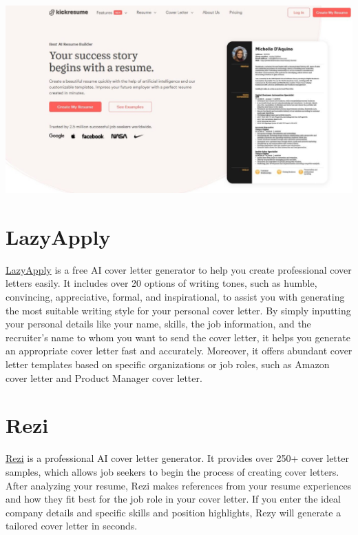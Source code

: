 \documentclass[
]{book}
\begin{document}
\includegraphics[width=5.46875in,height=\textheight]{Kickresume pic.png}

\hypertarget{lazyapply}{%
\section{LazyApply}\label{lazyapply}}

\href{https://lazyapply.com/cover-letter-generator}{LazyApply} is a free AI cover letter generator to help you create professional cover letters easily. It includes over 20 options of writing tones, such as humble, convincing, appreciative, formal, and inspirational, to assist you with generating the most suitable writing style for your personal cover letter. By simply inputting your personal details like your name, skills, the job information, and the recruiter's name to whom you want to send the cover letter, it helps you generate an appropriate cover letter fast and accurately. Moreover, it offers abundant cover letter templates based on specific organizations or job roles, such as Amazon cover letter and Product Manager cover letter.

\hypertarget{rezi}{%
\section{Rezi}\label{rezi}}

\href{https://www.rezi.ai/}{Rezi} is a professional AI cover letter generator. It provides over 250+ cover letter samples, which allows job seekers to begin the process of creating cover letters. After analyzing your resume, Rezi makes references from your resume experiences and how they fit best for the job role in your cover letter. If you enter the ideal company details and specific skills and position highlights, Rezy will generate a tailored cover letter in seconds.~
\end{document}
